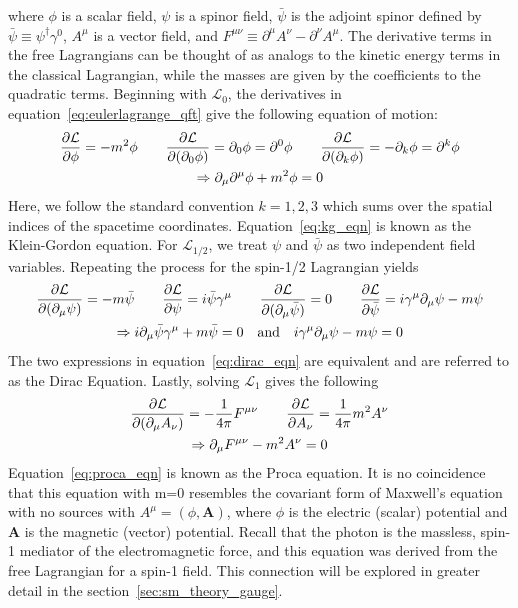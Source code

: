 where $\phi$ is a scalar field, $\psi$ is a spinor field, $\bar{\psi}$ is the adjoint spinor defined by $\bar{\psi}\equiv\psi^\dagger\gamma^0$, $A^\mu$ is a vector field, and $F^{\mu\nu}\equiv\partial^\mu A^\nu-\partial^\nu A^\mu$. The derivative terms in the free Lagrangians can be thought of as analogs to the kinetic energy terms in the classical Lagrangian, while the masses are given by the coefficients to the quadratic terms. Beginning with $\mathcal{L}_0$, the derivatives in equation~\ref{eq:eulerlagrange_qft} give the following equation of motion:
\begin{gather}
	\pdv{\mathcal{L}}{\phi}=-m^2\phi \qquad
	\pdv{\mathcal{L}}{(\partial_0\phi)}=\partial_0\phi=\partial^0\phi \qquad
	\pdv{\mathcal{L}}{(\partial_k\phi)}=-\partial_k\phi=\partial^k\phi	\\
	\Rightarrow \partial_\mu\partial^\mu\phi+m^2\phi=0 \label{eq:kg_eqn}
\end{gather}
Here, we follow the standard convention $k=1,2,3$ which sums over the spatial indices of the spacetime coordinates. Equation~\ref{eq:kg_eqn} is known as the Klein-Gordon equation. For $\mathcal{L}_{1/2}$, we treat $\psi$ and $\bar{\psi}$ as two independent field variables. Repeating the process for the spin-1/2 Lagrangian yields
\begin{gather}
	\pdv{\mathcal{L}}{(\partial_\mu\psi)}=-m\bar{\psi} \qquad \pdv{\mathcal{L}}{\psi}=i\bar{\psi}\gamma^\mu \qquad
	\pdv{\mathcal{L}}{(\partial_\mu\bar{\psi})}=0 \qquad
	\pdv{\mathcal{L}}{\bar{\psi}}=i\gamma^\mu\partial_\mu\psi-m\psi	\\
	\Rightarrow i\partial_\mu\bar{\psi}\gamma^\mu+m\bar{\psi}=0 \quad \text{and} \quad i\gamma^\mu\partial_\mu\psi-m\psi=0 \label{eq:dirac_eqn}
\end{gather}
The two expressions in equation~\ref{eq:dirac_eqn} are equivalent and are referred to as the Dirac Equation. Lastly, solving $\mathcal{L}_1$ gives the following
\begin{gather}
	\pdv{\mathcal{L}}{(\partial_\mu A_\nu)}=-\frac{1}{4\pi}F^{\mu\nu} \qquad \pdv{\mathcal{L}}{A_\nu}=\frac{1}{4\pi}m^2A^\nu \\
	\Rightarrow \partial_\mu F^{\mu\nu}-m^2A^\nu=0 \label{eq:proca_eqn}
\end{gather}
Equation~\ref{eq:proca_eqn} is known as the Proca equation. It is no coincidence that this equation with m=0 resembles the covariant form of Maxwell's equation with no sources with $A^\mu=(\phi, \mathbf{A})$, where $\phi$ is the electric (scalar) potential and $\mathbf{A}$ is the magnetic (vector) potential. Recall that the photon is the massless, spin-1 mediator of the electromagnetic force, and this equation was derived from the free Lagrangian for a spin-1 field. This connection will be explored in greater detail in the section~\ref{sec:sm_theory_gauge}.

